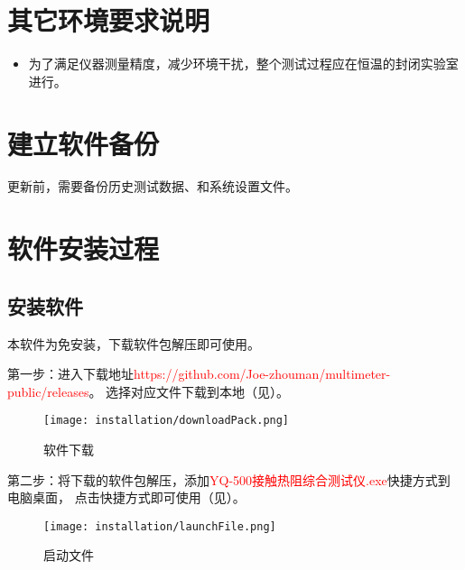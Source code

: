 \section{其它环境要求说明}
\begin{itemize}
    \item 为了满足仪器测量精度，减少环境干扰，整个测试过程应在恒温的封闭实验室进行。
\end{itemize}

\section{建立软件备份}
更新前，需要备份历史测试数据、和系统设置文件。

\section{软件安装过程}
\subsection{安装软件\label{subsec:install}}
\par 本软件为免安装，下载软件包解压即可使用。
\par 第一步：进入下载地址\textcolor{red}{https://github.com/Joe-zhouman/multimeter-public/releases}。
选择对应文件下载到本地（见）。
\begin{figure}[H]
    \centering
    \texttt{[image: installation/downloadPack.png]}
    \caption{ 软件下载 \label{fig:downloadPack}}
\end{figure}
\par 第二步：将下载的软件包解压，添加\textcolor{red}{YQ-500接触热阻综合测试仪.exe}快捷方式到电脑桌面，
点击快捷方式即可使用（见）。
\begin{figure}[H]
    \centering
    \texttt{[image: installation/launchFile.png]}
    \caption{ 启动文件 \label{fig:launchFile}}
\end{figure}
